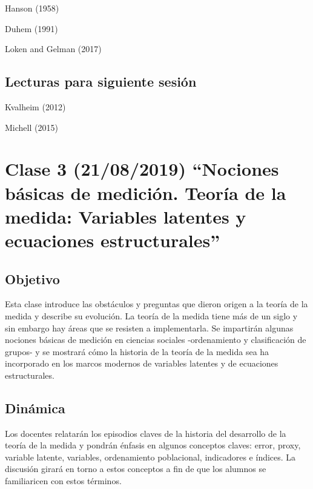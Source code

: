\documentclass[11pt,]{article}
\begin{document}
Hanson (1958)

Duhem (1991)

Loken and Gelman (2017)

\hypertarget{lecturas-para-siguiente-sesion}{%
\subsection{Lecturas para siguiente
sesión}\label{lecturas-para-siguiente-sesion}}

Kvalheim (2012)

Michell (2015)

\hypertarget{clase-3-21082019-nociones-basicas-de-medicion.-teoria-de-la-medida-variables-latentes-y-ecuaciones-estructurales}{%
\section{Clase 3 (21/08/2019) ``Nociones básicas de medición. Teoría de
la medida: Variables latentes y ecuaciones
estructurales''}\label{clase-3-21082019-nociones-basicas-de-medicion.-teoria-de-la-medida-variables-latentes-y-ecuaciones-estructurales}}

\hypertarget{objetivo-2}{%
\subsection{Objetivo}\label{objetivo-2}}

Esta clase introduce las obstáculos y preguntas que dieron origen a la
teoría de la medida y describe su evolución. La teoría de la medida
tiene más de un siglo y sin embargo hay áreas que se resisten a
implementarla. Se impartirán algunas nociones básicas de medición en
ciencias sociales -ordenamiento y clasificación de grupos- y se mostrará
cómo la historia de la teoría de la medida sea ha incorporado en los
marcos modernos de variables latentes y de ecuaciones estructurales.

\hypertarget{dinamica-2}{%
\subsection{Dinámica}\label{dinamica-2}}

Los docentes relatarán los episodios claves de la historia del
desarrollo de la teoría de la medida y pondrán énfasis en algunos
conceptos claves: error, proxy, variable latente, variables,
ordenamiento poblacional, indicadores e índices. La discusión girará en
torno a estos conceptos a fin de que los alumnos se familiaricen con
estos términos.
\end{document}
